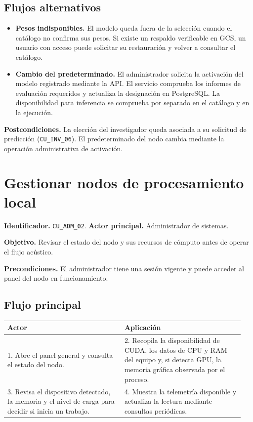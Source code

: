 \subsection*{Flujos alternativos}

\begin{itemize}
    \item \textbf{Pesos indisponibles.} El modelo queda fuera de la
    selección cuando el catálogo no confirma sus pesos. Si existe un
    respaldo verificable en GCS, un usuario con acceso puede solicitar
    su restauración y volver a consultar el catálogo.
    \item \textbf{Cambio del predeterminado.} El administrador solicita
    la activación del modelo registrado mediante la API. El servicio
    comprueba los informes de evaluación requeridos y actualiza la
    designación en PostgreSQL. La disponibilidad para inferencia se
    comprueba por separado en el catálogo y en la ejecución.
\end{itemize}

\noindent\textbf{Postcondiciones.} La elección del investigador queda
asociada a su solicitud de predicción (\texttt{CU\_INV\_06}). El
predeterminado del nodo cambia mediante la operación administrativa
de activación.

\section{Gestionar nodos de procesamiento local}
\label{cu:adm-02}

\noindent\textbf{Identificador.} \texttt{CU\_ADM\_02}.
\textbf{Actor principal.} Administrador de sistemas.

\noindent\textbf{Objetivo.} Revisar el estado del nodo y sus recursos
de cómputo antes de operar el flujo acústico.

\noindent\textbf{Precondiciones.} El administrador tiene una sesión
vigente y puede acceder al panel del nodo en funcionamiento.

\subsection*{Flujo principal}

\noindent
\begin{tabular}{@{}p{0.47\linewidth}p{0.48\linewidth}@{}}
    \hline
    \textbf{Actor} & \textbf{Aplicación} \\
    \hline
    1. Abre el panel general y consulta el estado del nodo. &
    2. Recopila la disponibilidad de CUDA, los datos de CPU y RAM del equipo y, si detecta GPU, la memoria gráfica observada por el proceso. \\
    3. Revisa el dispositivo detectado, la memoria y el nivel de carga para decidir si inicia un trabajo. &
    4. Muestra la telemetría disponible y actualiza la lectura mediante consultas periódicas. \\
    \hline
\end{tabular}

